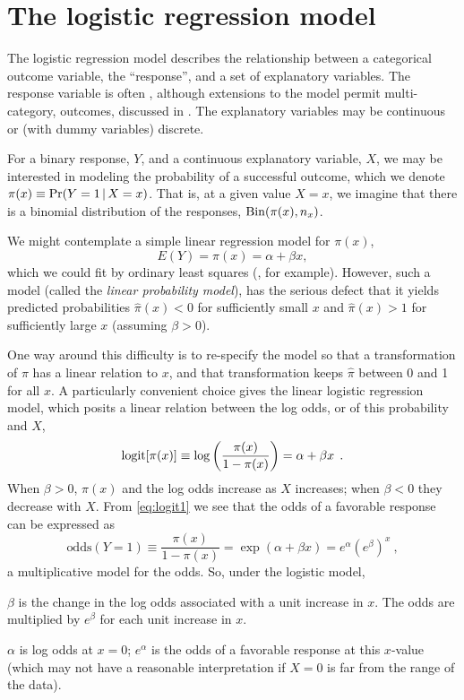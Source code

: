 \section{The logistic regression model}\label{sec:logist-model}

The logistic regression model
describes the relationship between a categorical outcome variable,
the ``response'', and a set of explanatory variables.
The response variable is often , although
extensions to the model permit multi-category,
 outcomes, discussed in
.
The explanatory variables may be continuous or (with dummy variables)
discrete.

For a binary response, $Y$, and a continuous explanatory variable, $X$,
we may be interested in modeling the probability of a successful
outcome, which we denote $\pi(x) \equiv \Pr(Y=1 \, | \, X=x)$.
That is, at a given value $X = x$, we imagine that there is a
binomial distribution of the responses, $\Bin( \pi(x), n_x )$.

We might contemplate a simple linear regression model for $\pi(x)$,
\begin{equation*}%
E ( Y ) = \pi(x) =
\alpha + \beta x \comma
\end{equation*}
which we could fit by ordinary least squares (, for example).
However, such a model (called the \emph{linear probability model}),
has the serious defect that it yields predicted probabilities $\hat{\pi}(x) < 0$
for sufficiently small $x$ and $\hat{\pi}(x) > 1$ for sufficiently large $x$
(assuming $\beta > 0$).

One way around this difficulty is to re-specify the model so that a
transformation of $\pi$ has a linear relation to $x$, and that transformation
keeps $\hat{\pi}$ between 0 and 1 for all $x$.
A particularly convenient choice gives the linear logistic regression model, which posits a linear relation between
the log odds, or  of this probability and $X$,
\begin{equation}\label{eq:logit1}
\logit[ \pi(x) ] \equiv
\log \left( \frac{\pi(x) }{1-\pi(x) } \right) =
\alpha + \beta x \period
\end{equation}
When $\beta > 0$, $\pi (x)$ and the log odds increase as $X$ increases;
when $\beta < 0$ they decrease with $X$.
From \eqref{eq:logit1} we see that the odds of a favorable response
can be expressed as
%
\begin{equation}\label{eq:logit2}
\mbox{odds}(Y=1) \equiv \frac{\pi(x) }{1-\pi(x) }  =
\exp (\alpha + \beta x) = e^{\alpha} ( e^{\beta} )^x \: ,
\end{equation}
%
a multiplicative model for the odds.
So, under the logistic model,
\begin{itemize*}
\item $\beta$ is the change in the log odds associated with a unit
increase in $x$.
The odds are multiplied by $e^{\beta}$ for each unit increase in $x$.
\item $\alpha$ is log odds at $x=0$; $e^{\alpha}$ is the odds of
a favorable response at this $x$-value
(which may not have a reasonable interpretation if $X=0$ is far from
the range of the data).
\end{itemize*}

